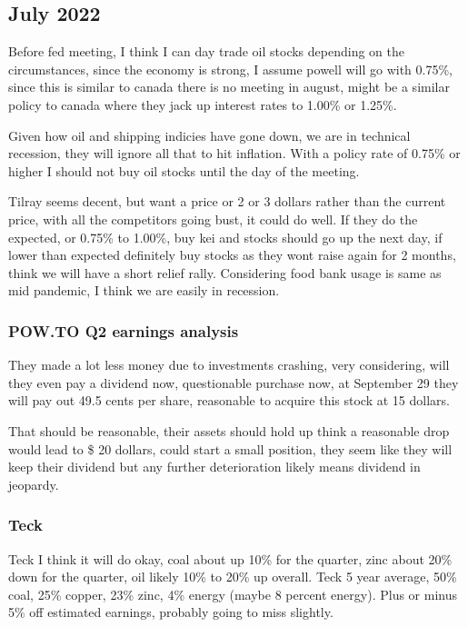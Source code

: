 \subsection{July 2022}

Before fed meeting, I think I can day trade oil stocks depending on the circumstances, since the economy is strong, I assume powell will go with 0.75\%, since this is similar to canada there is no meeting in august, might be a similar policy to canada where they jack up interest rates to 1.00\% or 1.25\%.

Given how oil and shipping indicies have gone down, we are in technical recession, they will ignore all that to hit inflation. With a policy rate of 0.75\% or higher I should not buy oil stocks until the day of the meeting.

Tilray seems decent, but want a price or 2 or 3 dollars rather than the current price, with all the competitors going bust, it could do well. If they do the expected, or 0.75\% to 1.00\%, buy kei and stocks should go up the next day, if lower than expected definitely buy stocks as they wont raise again for 2 months, think we will have a short relief rally. Considering food bank usage is same as mid pandemic, I think we are easily in recession.


\subsubsection{POW.TO Q2 earnings analysis}

They made a lot less money due to investments crashing, very considering, will they even pay a dividend now, questionable purchase now, at 	September 29 they will pay out 49.5 cents per share, reasonable to acquire this stock at 15 dollars.

That should be reasonable, their assets should hold up think a reasonable drop would lead to \$ 20 dollars, could start a small position, they seem like they will keep their dividend but any further deterioration likely means dividend in jeopardy.

\subsubsection{Teck}
Teck I think it will do okay, coal about up 10\% for the quarter, zinc about 20\% down for the quarter, oil likely 10\% to 20\% up overall. Teck 5 year average, 50\% coal, 25\% copper, 23\% zinc, 4\% energy (maybe 8 percent energy). Plus or minus 5\% off estimated earnings, probably going to miss slightly.

